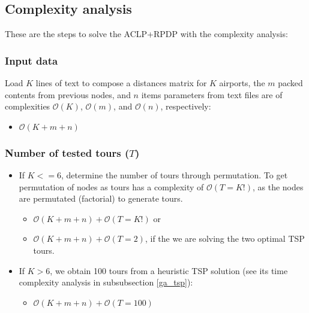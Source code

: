 \documentclass[preprint,authoryear]{elsarticle}
\begin{document}
{\color{blue}
\subsection{Complexity analysis}


These are the steps to solve the ACLP+RPDP with the complexity analysis:

\subsubsection{Input data}

Load $K$ lines of text to compose a distances matrix for $K$ airports, the $m$ packed contents from previous nodes, and $n$ items parameters from text files are of complexities $\mathcal{O}(K)$, $\mathcal{O}(m)$, and $\mathcal{O}(n)$, respectively:

	\begin{itemize}
		\item $\mathcal{O}(K + m + n)$
	\end{itemize}


\subsubsection{Number of tested tours ($T$)}

\begin{itemize}
\item If $K <= 6$, determine the number of tours through permutation. To get permutation of nodes as tours has a complexity of $\mathcal{O}(T = K!)$, as the nodes are permutated (factorial) to generate tours.

	\begin{itemize}
	\item $ \mathcal{O}(K + m + n) + \mathcal{O}(T = K!)$ or
	\item $ \mathcal{O}(K + m + n) + \mathcal{O}(T = 2)$, if the we are solving the two optimal TSP tours.
	\end{itemize}

\item If $K > 6$, we obtain 100 tours from a heuristic TSP solution (see its time complexity analysis in subsubsection \ref{ga_tsp}):

	\begin{itemize}
		\item $\mathcal{O}(K + m + n) + \mathcal{O}(T = 100)$
	\end{itemize}
\end{itemize}

}
\end{document}
